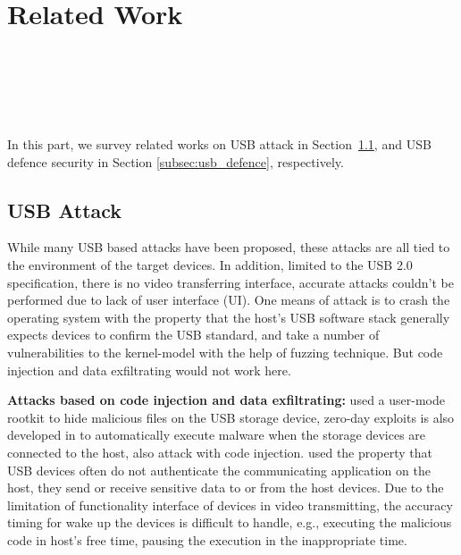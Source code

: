 \section{Related Work}
\label{sec:related_work}
\\
\\
\\
\\
\\

In this part, we survey related works on USB attack in Section~\ref{subsec:usb_attack}, and USB defence security in Section \ref{subsec:usb_defence}, respectively.

\subsection{USB Attack}
\label{subsec:usb_attack}
While many USB based attacks have been proposed, these attacks are all tied to the environment of the target devices. In addition, limited to the USB 2.0\cite{usb20} specification, there is no video transferring interface, accurate attacks couldn't be performed due to lack of user interface (UI). One means of attack is to crash the operating system with the property that the host's USB software stack generally expects devices to confirm the USB standard, \cite{facedancer} and \cite{syzkaller} take a number of vulnerabilities to the kernel-model with the help of fuzzing technique. But code injection and data exfiltrating would not work here. 

\textbf{Attacks based on code injection and data exfiltrating: } \cite{duqu} used a user-mode rootkit to hide malicious files on the USB storage device, zero-day exploits is also developed in \cite{zero-day} to automatically execute malware when the storage devices are connected to the host, \cite{brain, stuxnet, conficker,flame} also attack with code injection. \cite{webcam, malware, audioextraction, usbee, turnip} used the property that USB devices often do not authenticate the communicating application on the host, they send or receive sensitive data to or from the host devices. Due to the limitation of functionality interface of devices in video transmitting, the accuracy timing for wake up the devices is difficult to handle, e.g., executing the malicious code in host's free time, pausing the execution in the inappropriate time. 

